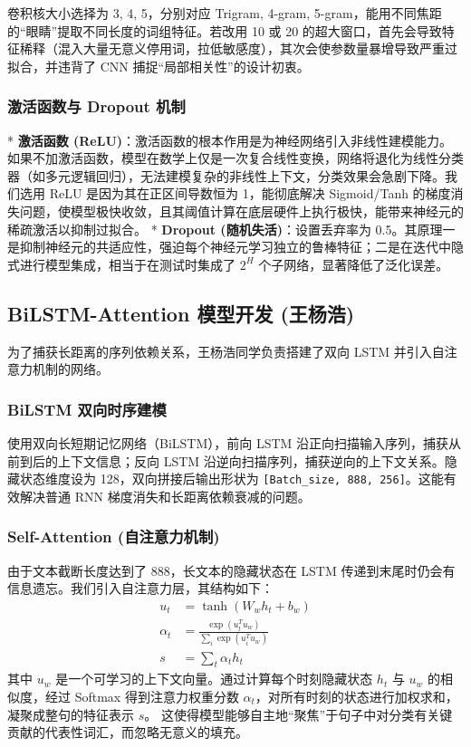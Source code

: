 \documentclass[UTF8,a4paper,11pt]{ctexart}
\begin{document}
卷积核大小选择为 3, 4, 5，分别对应 Trigram, 4-gram, 5-gram，能用不同焦距的“眼睛”提取不同长度的词组特征。若改用 10 或 20 的超大窗口，首先会导致特征稀释（混入大量无意义停用词，拉低敏感度），其次会使参数量暴增导致严重过拟合，并违背了 CNN 捕捉“局部相关性”的设计初衷。

\subsubsection{激活函数与 Dropout 机制}
* \textbf{激活函数 (ReLU)}：激活函数的根本作用是为神经网络引入非线性建模能力。如果不加激活函数，模型在数学上仅是一次复合线性变换，网络将退化为线性分类器（如多元逻辑回归），无法建模复杂的非线性上下文，分类效果会急剧下降。我们选用 ReLU 是因为其在正区间导数恒为 1，能彻底解决 Sigmoid/Tanh 的梯度消失问题，使模型极快收敛，且其阈值计算在底层硬件上执行极快，能带来神经元的稀疏激活以抑制过拟合。
* \textbf{Dropout (随机失活)}：设置丢弃率为 0.5。其原理一是抑制神经元的共适应性，强迫每个神经元学习独立的鲁棒特征；二是在迭代中隐式进行模型集成，相当于在测试时集成了 $2^H$ 个子网络，显著降低了泛化误差。

\subsection{BiLSTM-Attention 模型开发 (王杨浩)}
为了捕获长距离的序列依赖关系，王杨浩同学负责搭建了双向 LSTM 并引入自注意力机制的网络。

\subsubsection{BiLSTM 双向时序建模}
使用双向长短期记忆网络（BiLSTM），前向 LSTM 沿正向扫描输入序列，捕获从前到后的上下文信息；反向 LSTM 沿逆向扫描序列，捕获逆向的上下文关系。隐藏状态维度设为 128，双向拼接后输出形状为 \texttt{[Batch\_size, 888, 256]}。这能有效解决普通 RNN 梯度消失和长距离依赖衰减的问题。

\subsubsection{Self-Attention (自注意力机制)}
由于文本截断长度达到了 888，长文本的隐藏状态在 LSTM 传递到末尾时仍会有信息遗忘。我们引入自注意力层，其结构如下：
\begin{align}
    u_t &= \tanh(W_w h_t + b_w) \\
    \alpha_t &= \frac{\exp(u_t^T u_w)}{\sum_i \exp(u_i^T u_w)} \\
    s &= \sum_t \alpha_t h_t
\end{align}
其中 $u_w$ 是一个可学习的上下文向量。通过计算每个时刻隐藏状态 $h_t$ 与 $u_w$ 的相似度，经过 Softmax 得到注意力权重分数 $\alpha_t$，对所有时刻的状态进行加权求和，凝聚成整句的特征表示 $s$。
这使得模型能够自主地“聚焦”于句子中对分类有关键贡献的代表性词汇，而忽略无意义的填充。
\end{document}
